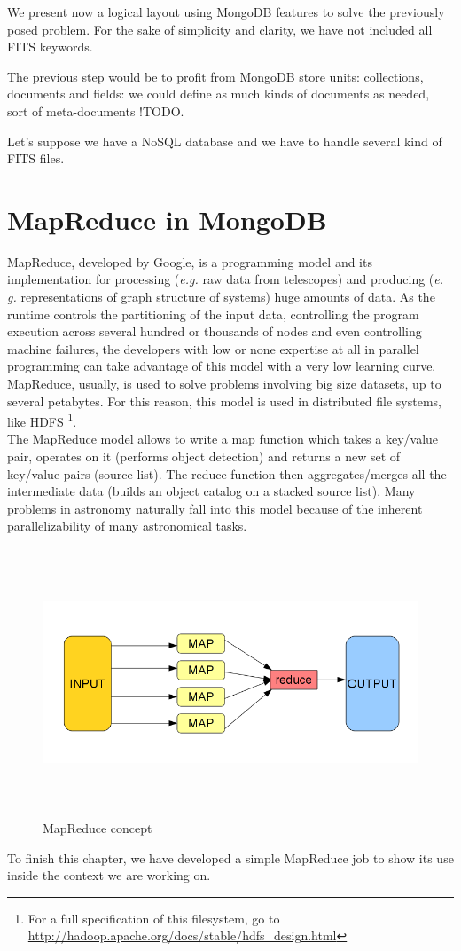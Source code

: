 We present now a logical layout using MongoDB features to solve the previously posed problem. For the sake of simplicity and clarity, we have not included all FITS keywords. \newline

The previous step would be to profit from MongoDB store units: collections, documents and fields: we could define as much kinds of documents as needed, sort of meta-documents !TODO.

Let's suppose we have a NoSQL database and we have to handle several kind of FITS files.


\section{MapReduce in MongoDB}

MapReduce, developed by Google, is a programming model and its implementation for processing (\textit{e.g.} raw data from telescopes) and producing (\textit{e. g.} representations of graph structure of systems) huge amounts of data. As the runtime controls the partitioning of the input data, controlling the program execution across several hundred or thousands of nodes and even controlling machine failures, the developers with low or none expertise at all in parallel programming can take advantage of this model with a very low learning curve.\\

MapReduce, usually, is used to solve problems involving big size datasets, up to several petabytes. For this reason, this model is used in distributed file systems, like HDFS \footnote{For a full specification of this filesystem, go to \url{http://hadoop.apache.org/docs/stable/hdfs_design.html}}.\\

The MapReduce model allows to write a map function which takes a key/value pair, operates on it (performs object detection) and returns a new set of key/value pairs (source list). The reduce function then aggregates/merges all the intermediate data (builds an object catalog on a stacked source list). Many problems in astronomy naturally fall into this model because of the inherent parallelizability of many astronomical tasks.

\begin{figure}[H]
\centering
\includegraphics[width=16cm,height=8cm]{images/map_reduce_chart.png}
\caption{MapReduce concept}
\end{figure}

\newpage

To finish this chapter, we have developed a simple MapReduce job to show its use inside the context we are working on.

